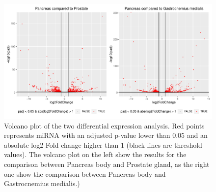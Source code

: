 \documentclass[a4paper, 11pt]{article}
\begin{document}
\begin{figure}[H]
\centering
\includegraphics[width=\columnwidth]{Figures/differential_analysis/volcano.pdf}
\caption{\footnotesize{Volcano plot of the two differential expression analysis. Red points represents miRNA with an adjusted p-value lower than 0.05 and an absolute log2 Fold change higher than 1 (black lines are threshold values). The volcano plot on the left show the results for the comparison between Pancreas body and Prostate gland, as the right one show the comparison between Pancreas body and Gastrocnemius medialis.)}}
\label{fig:volcano}
\end{figure}

\begin{multicols}{2}


\end{multicols}
\end{document}
